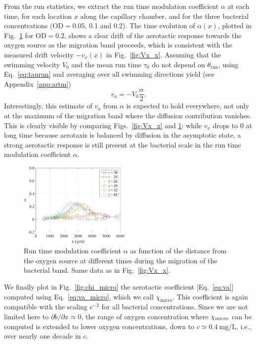 \documentclass[aps,a4paper,twocolumn,10pt,pre,showpacs]{revtex4-2}
\newcommand{\com}[1]{\textcolor{red}{#1}}
\begin{document}
From the run statistics, we extract the run time modulation coefficient $\alpha$ at each time, for each location $x$ along the capillary chamber, and for the three bacterial concentrations ($\mathrm{OD}=0.05$, 0.1 and 0.2). The time evolution of $\alpha(x)$, plotted in Fig.~\ref{fig:alpha_x} for $\mathrm{OD}=0.2$, shows a clear drift of the aerotactic response towards the oxygen source as the migration band proceeds, which is consistent with the measured drift velocity $-v_x(x)$ in Fig.~\ref{fig:Vx_x}. Assuming that the swimming velocity $V_0$ and the mean run time $\tau_0$ do not depend on $\theta_{\mathrm{run}}$, using Eq.~\eqref{eq:taurun} and averaging over all swimming directions yield (see Appendix~\ref{app:artm})
\begin{equation}
\label{eq:va_micro}
    v_a = -V_0 \dfrac{\alpha}{2}.
\end{equation}
Interestingly, this estimate of $v_a$ from $\alpha$ is expected to hold everywhere, not only at the maximum of the migration band where the diffusion contribution vanishes. This is clearly visible by comparing Figs.~\ref{fig:Vx_x} and \ref{fig:alpha_x}: while $v_x$ drops to 0 at long time because aerotaxis is balanced by diffusion in the asymptotic state, a strong aerotactic response is still present at the bacterial scale in the run time modulation coefficient $\alpha$.


\begin{figure}[bt]
\includegraphics[trim = 0mm 0mm 0mm 0mm, clip, width=0.48\textwidth, angle=0]{Fig09.png} 
\caption{Run time modulation coefficient $\alpha$ as function of the distance from the oxygen source at different times during the migration of the bacterial band. Same data as in Fig.~\ref{fig:Vx_x}.}
\label{fig:alpha_x}
\end{figure}

We finally plot in Fig.~\ref{fig:chi_micro} the aerotactic coefficient [Eq.~\eqref{eq:va}] computed using Eq.~\eqref{eq:va_micro}, which we call $\chi_{\mathrm{micro}}$. This coefficient is again compatible with the scaling $c^{-2}$ for all bacterial concentrations. Since we are not limited here to $\partial b/\partial x \simeq 0$, the range of oxygen concentration where $\chi_{\rm micro}$ can be computed is extended to lower oxygen concentrations, down to $c \simeq \SI{0,4}{\mg\per\liter}$, i.e., over nearly one decade in $c$. 
\end{document}
